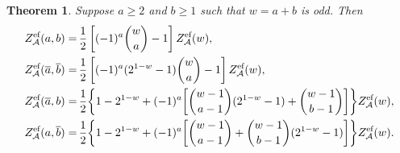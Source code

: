 \documentclass{article}
\newcommand{\calA}{\mathcal{A}}
\newcommand{\eff}{\text{\rm{ef}}}
\newcommand{\ol}{\overline}
\theoremstyle{plain}
\newtheorem{thm}{Theorem}[section]
\theoremstyle{definition}
\begin{document}
\begin{thm} \label{thm:effDBESoddWt}
Suppose $a\ge 2$ and $b\ge 1$ such that $w=a+b$ is odd. Then
\begin{align*}
Z_\calA^\eff(a,b)= &\, \frac12 \left[(-1)^a \binom{w}{a}-1\right]Z_\calA^\eff(w),\\ %
Z_\calA^\eff(\ol{a},\ol{b})= &\, \frac12 \left[(-1)^a (2^{1-w}-1)\binom{w}{a}-1\right]Z_\calA^\eff(w),\\ %
Z_\calA^\eff(\ol{a},b)= &\, \frac12\bigg\{1-2^{1-w}+(-1)^a \bigg[\binom{w-1}{a-1}(2^{1-w}-1) +\binom{w-1}{b-1}\bigg]\bigg\}Z_\calA^\eff(w),  \\ %
Z_\calA^\eff(a,\ol{b})= &\,\frac12\bigg\{1-2^{1-w} +(-1)^a \bigg[\binom{w-1}{a-1}+\binom{w-1}{b-1}(2^{1-w}-1)\bigg]\bigg\}Z_\calA^\eff(w). %
\end{align*}
\end{thm}
\end{document}
